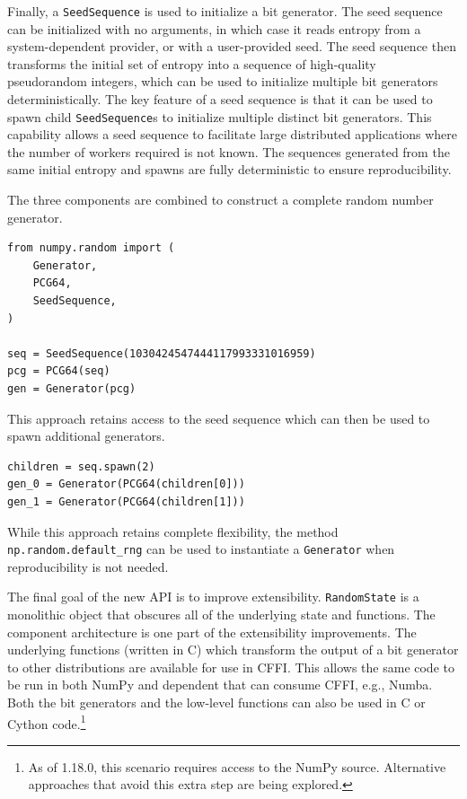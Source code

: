 Finally, a \texttt{SeedSequence} is used to initialize a bit generator. The seed
sequence can be initialized with no arguments, in which case it reads entropy
from a system-dependent provider, or with a user-provided seed. The seed
sequence then transforms the initial set of entropy into a sequence of
high-quality pseudorandom integers, which can be used to initialize multiple bit
generators deterministically. The key feature of a seed sequence is that
it can be used to spawn child \texttt{SeedSequence}s to initialize
multiple distinct bit generators.
This capability allows a seed sequence to facilitate large distributed applications
where the number of workers required is not known. The sequences generated from
the same initial entropy and spawns are fully deterministic to ensure
reproducibility.

The three components are combined to construct a complete random number
generator.

\begin{lstlisting}
from numpy.random import (
    Generator,
    PCG64,
    SeedSequence,
)

seq = SeedSequence(1030424547444117993331016959)
pcg = PCG64(seq)
gen = Generator(pcg)
\end{lstlisting}

This approach retains access to the seed sequence which can then be
used to spawn additional generators.

\begin{lstlisting}
children = seq.spawn(2)
gen_0 = Generator(PCG64(children[0]))
gen_1 = Generator(PCG64(children[1]))
\end{lstlisting}

While this approach retains complete flexibility, the method
\texttt{np.random.default\_rng} can be used to instantiate a \texttt{Generator} when
reproducibility is not needed.

The final goal of the new API is to improve extensibility. \texttt{RandomState} is
a monolithic object that obscures all of the underlying state and functions. The
component architecture is one part of the extensibility improvements. The
underlying functions (written in C) which transform the output of a bit
generator to other distributions are available for use in CFFI. This allows the
same code to be run in both NumPy and dependent that can consume CFFI, e.g.,
Numba. Both the bit generators and the low-level functions can also be used in C
or Cython code.\footnote{As of 1.18.0, this scenario requires access to the
NumPy source. Alternative approaches that avoid this extra step are being
explored.}

